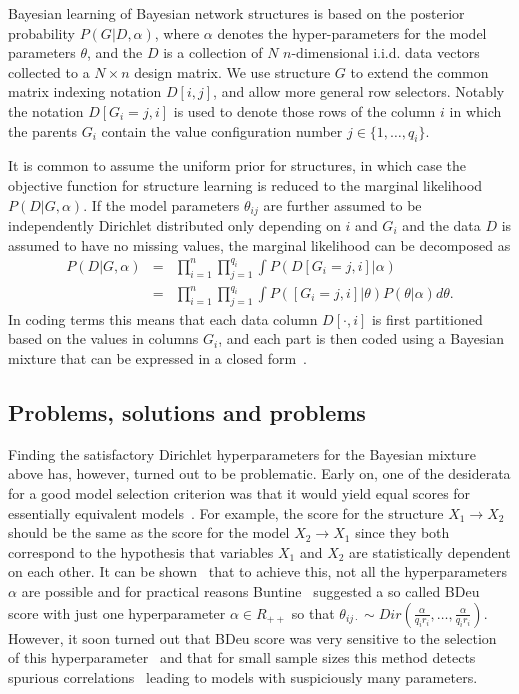 Bayesian learning of Bayesian network structures is based on the
posterior probability $P(G|D,\alpha)$, where $\alpha$ denotes the
hyper\nobreakdash-parameters for the model parameters $\theta$, and
the $D$ is a collection of $N$ $n$\nobreakdash-dimensional i.i.d. data
vectors collected to a $N\times n$ design matrix.  We use structure
$G$ to extend the common matrix indexing notation $D[i,j]$, and allow
more general row selectors.  Notably the notation $D[G_i=j,i]$ is used
to denote those rows of the column $i$ in which the parents $G_i$
contain the value configuration number $j\in\{1,\ldots,q_i\}$.

It is common to assume the uniform prior for structures, in which case
the objective function for structure learning is reduced to the
marginal likelihood $P(D|G,\alpha)$.  If the model parameters
$\theta_{ij}$ are further assumed to be independently Dirichlet
distributed only depending on $i$ and $G_{i}$ and the data $D$ is
assumed to have no missing values, the marginal likelihood can be
decomposed as
\begin{eqnarray}
\label{eqn:bayesmix}
P(D|G,\alpha) & = & \prod_{i=1}^{n}\prod_{j=1}^{q_i}\int
P(D[G_i=j,i]|\alpha)\\ & = & \prod_{i=1}^{n}\prod_{j=1}^{q_i}\int
P([G_i=j,i]|\theta)P(\theta|\alpha) d\theta.\nonumber
\end{eqnarray}
In coding terms this means that each data column $D[\cdot,i]$ is first partitioned based on the
values in columns $G_i$, and each part is then coded using a Bayesian mixture that can be expressed
in a closed form~\cite{Bunt91, Heck95}.

\subsection {Problems, solutions and problems}

Finding the satisfactory Dirichlet hyperparameters for the Bayesian
mixture above has, however, turned out to be problematic. Early on,
one of the desiderata for a good model selection criterion was that it
would yield equal scores for essentially equivalent
models~\cite{Verm90}.  For example, the score for the structure
$X_1\rightarrow X_2$ should be the same as the score for the model
$X_2 \rightarrow X_1$ since they both correspond to the hypothesis
that variables $X_1$ and $X_2$ are statistically dependent on each
other.  It can be shown~\cite{Heck95} that to achieve this, not all
the hyperparameters $\alpha$ are possible and for practical reasons
Buntine~\cite{Bunt91} suggested a so called BDeu score with just one
hyperparameter $\alpha\in R_{++}$ so that $\theta_{ij\cdot}\sim
Dir(\frac{\alpha}{q_i r_i},\ldots,\frac{\alpha}{q_i r_i})$.  However,
it soon turned out that BDeu score was very sensitive to the selection
of this hyperparameter~\cite{cosco.uai07} and that for small sample
sizes this method detects spurious correlations~\cite{Steck08} leading
to models with suspiciously many parameters. 

